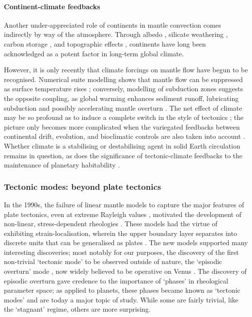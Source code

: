 \documentclass[a4paper,11pt,oneside]{book}
\begin{document}
\paragraph{Continent-climate feedbacks}

Another under-appreciated role of continents in mantle convection comes indirectly by way of the atmosphere. Through albedo \cite{Hyde1990-zc}, silicate weathering \citet{Raymo1992-qk, Berner1997-km}, carbon storage \cite{Marshall1988-sm}, and topographic effects \citet{Birchfield1983-ui, Stolar2006-qi}, continents have long been acknowledged as a potent factor in long-term global climate.

However, it is only recently that climate forcings on mantle flow have begun to be recognised. Numerical suite modelling shows that mantle flow can be suppressed as surface temperature rises \cite{Weller2015-ci}; conversely, modelling of subduction zones suggests the opposite coupling, as global warming enhances sediment runoff, lubricating subduction and possibly accelerating mantle overturn \citet{Behr2018-yf, Sobolev2019-rg}. The net effect of climate may be so profound as to induce a complete switch in the style of tectonics \citet{Lenardic2008-ic, Lenardic2016-ue}; the picture only becomes more complicated when the variegated feedbacks between continental drift, evolution, and bioclimatic controls are also taken into account \cite{Zerkle2018-ui}. Whether climate is a stabilising or destabilising agent in solid Earth circulation remains in question, as does the significance of tectonic-climate feedbacks to the maintenance of planetary habitability \cite{Foley2015-cw}.

\subsubsection{Tectonic modes: beyond plate tectonics}

In the 1990s, the failure of linear mantle models to capture the major features of plate tectonics, even at extreme Rayleigh values \cite{Moresi1995-rn}, motivated the development of non-linear, stress-dependent rheologies \citet{Bercovici1993-tk, Solomatov1995-is}. These models had the virtue of exhibiting strain-localisation, wherein the upper boundary layer separates into discrete units that can be generalised as plates \citet{Bercovici1995-yf, Zhong1998-qg}. The new models supported many interesting discoveries; most notably for our purposes, the discovery of the first non-trivial `tectonic mode' to be observed outside of nature, the `episodic overturn' mode \cite{Moresi1998-az}, now widely believed to be operative on Venus \citet{Turcotte1999-ne, Huang2013-lc}. The discovery of episodic overturn gave credence to the importance of `phases' in rheological parameter space; as applied to planets, these phases became known as `tectonic modes' and are today a major topic of study. While some are fairly trivial, like the `stagnant' regime, others are more surprising.
\end{document}
